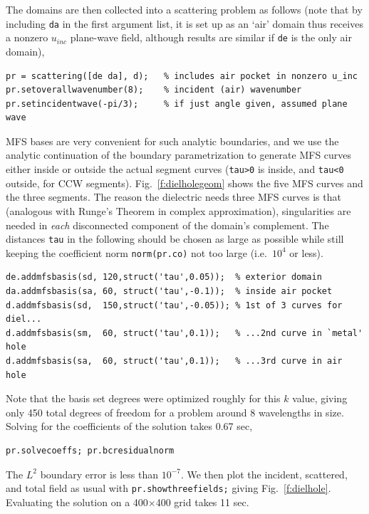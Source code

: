 The domains are then collected into a scattering problem as follows (note
that by including {\tt da} in the first argument list, it is set up as an
`air' domain thus receives a nonzero $u_{inc}$ plane-wave field, although
results are similar if {\tt de} is the only air domain),
\begin{verbatim}
pr = scattering([de da], d);   % includes air pocket in nonzero u_inc
pr.setoverallwavenumber(8);    % incident (air) wavenumber
pr.setincidentwave(-pi/3);     % if just angle given, assumed plane wave
\end{verbatim}

MFS bases are very convenient for such analytic boundaries, and we use the
analytic continuation of the boundary parametrization to generate MFS curves
either inside or outside the actual segment curves
({\tt tau>0} is inside, and {\tt tau<0} outside, for CCW segments).
Fig.~\ref{f:dielholegeom} shows the five MFS curves and the three segments.
The reason the dielectric needs three MFS curves is that (analogous
with Runge's Theorem in complex approximation), singularities are needed in
{\em each} disconnected component of the domain's complement.
The distances {\tt tau} in the following should be chosen as large as possible
while still keeping the coefficient norm {\tt norm(pr.co)} not too large
(i.e.\ $10^4$ or less).
\begin{verbatim}
de.addmfsbasis(sd, 120,struct('tau',0.05));  % exterior domain
da.addmfsbasis(sa, 60, struct('tau',-0.1));  % inside air pocket
d.addmfsbasis(sd,  150,struct('tau',-0.05)); % 1st of 3 curves for diel...
d.addmfsbasis(sm,  60, struct('tau',0.1));   % ...2nd curve in `metal' hole
d.addmfsbasis(sa,  60, struct('tau',0.1));   % ...3rd curve in air hole
\end{verbatim}
Note that the basis set degrees were optimized roughly for this $k$ value,
giving only 450 total degrees of freedom for a problem around
8 wavelengths in size.
Solving for the coefficients of the solution takes 0.67 sec,
\begin{verbatim}
pr.solvecoeffs; pr.bcresidualnorm
\end{verbatim}
The $L^2$ boundary error is less than $10^{-7}$.
We then plot the incident, scattered, and total field as usual with
{\tt pr.showthreefields;} giving Fig.~\ref{f:dielhole}.
Evaluating the solution on a 400$\times$400 grid takes 11 sec.

